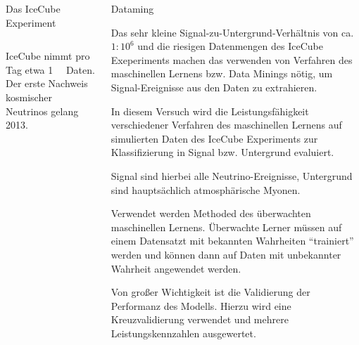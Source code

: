 \documentclass[t]{beamer}
\begin{document}
\begin{columns}[onlytextwidth]
\begin{column}{0.5\textwidth}
\begin{block}[equal height group=A]{Das IceCube Experiment}
\begin{columns}[onlytextwidth]
\begin{column}{0.48\textwidth}
            IceCube nimmt pro Tag etwa \SI{1}{\tera\byte} Daten. 
            Der erste Nachweis kosmischer Neutrinos gelang 2013.
          \end{column}%
        \end{columns}%
      \end{block}%
    \end{column}%
    \begin{column}{0.5\textwidth}%
      \begin{block}[equal height group=A]{Dataming}%
        \begin{multicols}{2}
          Das sehr kleine Signal-zu-Untergrund-Verhältnis von ca.\ $1:10^6$ und die 
          riesigen Datenmengen des IceCube Exeperiments machen das 
          verwenden von Verfahren des maschinellen Lernens bzw. Data Minings nötig, 
          um Signal-Ereignisse aus den Daten zu extrahieren.

          In diesem Versuch wird die Leistungsfähigkeit verschiedener Verfahren
          des maschinellen Lernens auf simulierten Daten des IceCube Experiments 
          zur Klassifizierung in Signal bzw. Untergrund evaluiert.

          Signal sind hierbei alle Neutrino-Ereignisse, Untergrund sind hauptsächlich
          atmosphärische Myonen.

          Verwendet werden Methoded des überwachten maschinellen Lernens.
          Überwachte Lerner müssen auf einem Datensatzt mit bekannten Wahrheiten
          \enquote{trainiert} werden und können dann auf Daten mit unbekannter 
          Wahrheit angewendet werden.

          Von großer Wichtigkeit ist die Validierung der Performanz des Modells.
          Hierzu wird eine Kreuzvalidierung verwendet und mehrere Leistungskennzahlen
          ausgewertet.
        \end{multicols}
      \end{block}%
    \end{column}%
  \end{columns}%
\end{document}
